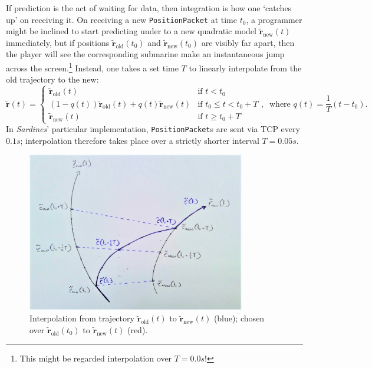 \documentclass[a4paper, 9pt]{article}
\begin{document}
\begin{flushleft}
\vspace{5pt}\noindent
If prediction is the act of waiting for data, then integration is how one `catches up' on receiving it. On receiving a new \texttt{PositionPacket} at time $t_0$, a programmer might be inclined to start predicting under to a new quadratic model $\mathbf{\tilde{r}}_{\textrm{new}}(t)$ immediately, but if positions $\mathbf{\tilde{r}}_{\textrm{old}}(t_0)$ and $\mathbf{\tilde{r}}_{\textrm{new}}(t_0)$ are visibly far apart, then the player will see the corresponding submarine make an instantaneous jump across the screen.\footnote{This might be regarded interpolation over $T = 0.0s$!} Instead, one takes a set time $T$ to linearly interpolate from the old trajectory to the new:
$$\mathbf{\tilde{r}}(t) = \begin{cases} 
\mathbf{\tilde{r}}_{\textrm{old}}(t) & \textrm{if $t < t_0$} \\
(1-q(t))\mathbf{\tilde{r}}_{\textrm{old}}(t) + q(t)\mathbf{\tilde{r}}_{\textrm{new}}(t) & \textrm{if $t_0 \leq t < t_0+T$} \\
\mathbf{\tilde{r}}_{\textrm{new}}(t) & \textrm{if $t \geq t_0+T$}
\end{cases}, \;\; \textrm{where $q(t) = \frac{1}{T}\left(t-t_0\right)$.}$$
In \textit{Sardines}' particular implementation, \texttt{PositionPacket}s are sent via TCP every $0.1s$; interpolation therefore takes place over a strictly shorter interval $T = 0.05s$. 

\begin{figure}[h]
\centering
\includegraphics[width=0.85\textwidth]{Interpolation}
\caption{Interpolation from trajectory $\mathbf{\tilde{r}}_{\textrm{old}}(t)$ to $\mathbf{\tilde{r}}_{\textrm{new}}(t)$ (blue); chosen over $\mathbf{\tilde{r}}_{\textrm{old}}(t_0)$ to $\mathbf{\tilde{r}}_{\textrm{new}}(t)$ (red).}
\label{Interpolation}
\end{figure}


\end{flushleft}
\end{document}

